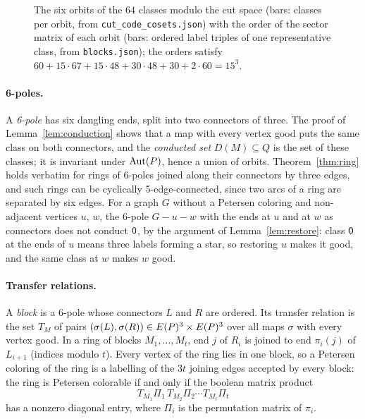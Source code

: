 \begin{figure}[t]\centering

\caption{The six orbits of the 64 classes modulo the cut space (bars: classes per orbit, from \texttt{cut\_code\_cosets.json}) with the order
of the sector matrix of each orbit (bars: ordered label triples of one representative class, from \texttt{blocks.json}); the orders
satisfy $60 + 15\cdot 67 + 15 \cdot 48 + 30\cdot 48 + 30 + 2\cdot 60 = 15^3$.}\label{fig:orbits}
\end{figure}

\paragraph{6-poles.} A \emph{6-pole} has six dangling ends, split into two connectors of three. The
proof of Lemma~\ref{lem:conduction} shows that a map with every vertex good puts the same class on
both connectors, and the \emph{conducted set} $D(M) \subseteq Q$ is the set of these classes; it
is invariant under $\mathrm{Aut}(P)$, hence a union of orbits. Theorem~\ref{thm:ring} holds
verbatim for rings of 6-poles joined along their connectors by three edges, and such rings can be
cyclically 5-edge-connected, since two arcs of a ring are separated by six edges. For a graph $G$
without a Petersen coloring and non-adjacent vertices $u$, $w$, the 6-pole $G - u - w$ with the
ends at $u$ and at $w$ as connectors does not conduct $\mathsf{0}$, by the argument of
Lemma~\ref{lem:restore}: class $\mathsf{0}$ at the ends of $u$ means three labels forming a star, so restoring $u$
makes it good, and the same class at $w$ makes $w$ good.

\paragraph{Transfer relations.} A \emph{block} is a 6-pole whose connectors $L$ and $R$ are ordered.
Its transfer relation is the set $T_M$ of pairs $(\sigma(L), \sigma(R)) \in E(P)^3 \times E(P)^3$
over all maps $\sigma$ with every vertex good. In a ring of blocks $M_1, \dots, M_t$, end $j$ of $R_i$
is joined to end $\pi_i(j)$ of $L_{i+1}$ (indices modulo $t$). Every vertex of the ring lies in one
block, so a Petersen coloring of the ring is a labelling of the $3t$ joining edges accepted by
every block: the ring is Petersen colorable if and only if the boolean matrix product
\begin{equation}\label{eq:ringproduct}
T_{M_1} \Pi_1\, T_{M_2} \Pi_2 \cdots T_{M_t} \Pi_t
\end{equation}
has a nonzero diagonal entry, where $\Pi_i$ is the permutation matrix of $\pi_i$.

